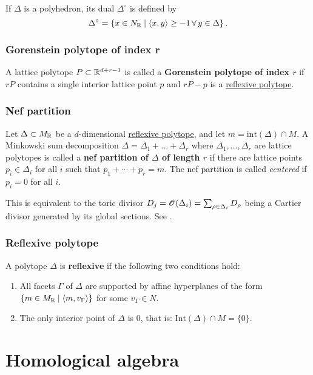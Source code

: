 \documentclass[11pt, english]{article}
\begin{document}
If $\Delta$ is a polyhedron, its dual $\Delta^\circ$ is defined by
\[
\Delta^\circ = \left\{ x \in N_{\mathbb{R}} \mid \langle x,y\rangle \geq -1 \,\forall \, y \in \Delta \right\}.
\]

\subsubsection{Gorenstein polytope of index r}
\label{gorensteinpolytope}
A lattice polytope $P \subset \mathbb{R}^{d+r-1}$ is called a \textbf{Gorenstein polytope of index $r$} if $rP$ contains a single interior lattice point $p$ and $rP-p$ is a \hyperref[reflexivepolytope]{reflexive polytope}.

\subsubsection{Nef partition}
\label{nefpartition}
Let $\Delta \subset M_{\mathbb{R}}$ be a $d$-dimensional \hyperref[reflexivepolytope]{reflexive polytope}, and let $m=\mathrm{int}(\Delta) \cap M$. A Minkowski sum decomposition $\Delta=\Delta_1+\dotsc +\Delta_r$ where $\Delta_1,\ldots,\Delta_r$ are lattice polytopes is called a \textbf{nef partition of $\Delta$ of length $r$} if there are lattice points $p_i \in \Delta_i$ for all $i$ such that $p_1+\cdots+p_r = m$. The nef partition is called \emph{centered} if $p_i=0$  for all $i$. 

This is equivalent to the toric divisor $D_j=\operatorname{\mathscr{O}}(\Delta_i)=\sum_{\rho \in \Delta_i} D_\rho$ being a Cartier divisor generated by its global sections. See \cite[Chapter 4.3]{mirrorsymalggeo}.  

\subsubsection{Reflexive polytope}
\label{reflexivepolytope}

A polytope $\Delta$ is \textbf{reflexive} if the following two conditions hold:
\begin{enumerate}
\item All facets $\Gamma$ of $\Delta$ are supported by affine hyperplanes of the form $\{ m \in M_{\mathbb{R}} \mid \langle m,v_\Gamma \rangle \}$ for some $v_\Gamma \in N$.
\item The only interior point of $\Delta$ is $0$, that is: $\mathrm{Int}(\Delta) \cap M = \{0\}$.
\end{enumerate}

\section{Homological algebra}
\end{document}
